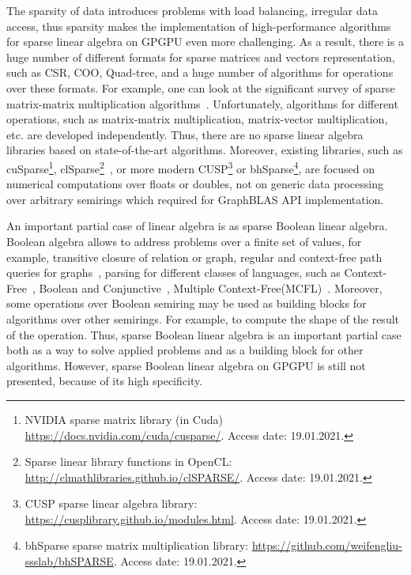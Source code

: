 The sparsity of data introduces problems with load balancing, irregular data access, thus sparsity makes the implementation of high-performance algorithms for sparse linear algebra on GPGPU even more challenging.
As a result, there is a huge number of different formats for sparse matrices and vectors representation, such as CSR, COO, Quad-tree, and a huge number of algorithms for operations over these formats. 
For example, one can look at the significant survey of sparse matrix-matrix multiplication algorithms~\cite{Gao2020ASS}. 
Unfortunately, algorithms for different operations, such as matrix-matrix multiplication, matrix-vector multiplication, etc. are developed independently. 
Thus, there are no sparse linear algebra libraries based on state-of-the-art algorithms.
Moreover, existing libraries, such as cuSparse\footnote{NVIDIA sparse matrix library (in Cuda) \url{https://docs.nvidia.com/cuda/cusparse/}. Access date: 19.01.2021.}, clSparse\footnote{Sparse linear library functions in OpenCL: \url{http://clmathlibraries.github.io/clSPARSE/}. Access date: 19.01.2021.}~\cite{10.1145/2909437.2909442}, or more modern CUSP\footnote{CUSP sparse linear algebra library: \url{https://cusplibrary.github.io/modules.html}. Access date: 19.01.2021.} or bhSparse\footnote{bhSparse sparse matrix multiplication library: \url{https://github.com/weifengliu-ssslab/bhSPARSE}. Access date: 19.01.2021.}, are focused on numerical computations over floats or doubles, not on generic data processing over arbitrary semirings which required for GraphBLAS API implementation.

An important partial case of linear algebra is as sparse Boolean linear algebra.
Boolean algebra allows to address problems over a finite set of values, for example, transitive closure of relation or graph, regular and context-free path queries for graphs~\cite{10.1145/3210259.3210264}, parsing for different classes of languages, such as Context-Free~\cite{10.1016/S0022-0000(75)80046-8}, Boolean and Conjunctive~\cite{OKHOTIN2014101}, Multiple Context-Free(MCFL)~\cite{10.5555/972525.972527}.
Moreover, some operations over Boolean semiring may be used as building blocks for algorithms over other semirings. 
For example, to compute the shape of the result of the operation.
Thus, sparse Boolean linear algebra is an important partial case both as a way to solve applied problems and as a building block for other algorithms.
However, sparse Boolean linear algebra on GPGPU is still not presented, because of its high specificity.

